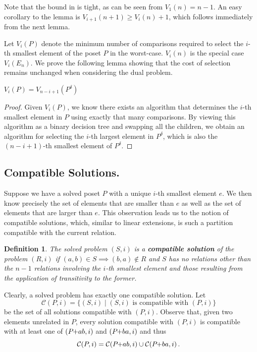 \documentclass[twoside,leqno,twocolumn]{article}
\newcommand{\pchild}[3]{{#1}\kern-1pt{+}{#2}{#3}}
\newcommand{\dual}[1]{{#1}^{\delta}}
\newtheorem{definition}{Definition}[section]
\begin{document}
Note that the bound in  is tight, as can be seen from $V_1(n) = n - 1$.
An easy corollary to the lemma is $V_{i + 1}(n + 1) \geq V_i(n) + 1$, which follows immediately from the next lemma.

Let $V_i(P)$ denote the minimum number of comparisons required to select the $i$-th smallest element of the poset $P$ in the worst-case.
$V_i(n)$ is the special case $V_i(E_n)$.
We prove the following lemma showing that the cost of selection remains unchanged when considering the dual problem.

\begin{lemma} \label{lemma:dual_poset_allowed}
  $V_i(P) = V_{n - i + 1}(\dual{P})$
\end{lemma}

\begin{proof}
  Given $V_i(P)$, we know there exists an algorithm that determines the $i$-th smallest element in $P$ using exactly that many comparisons.
  By viewing this algorithm as a binary decision tree and swapping all the children, we obtain an algorithm for selecting the $i$-th largest element in $\dual{P}$, which is also the $(n - i + 1)$-th smallest element of $\dual{P}$.
\end{proof}

\subsection{Compatible Solutions.}
Suppose we have a solved poset $P$ with a unique $i$-th smallest element $e$.
We then know precisely the set of elements that are smaller than $e$ as well as the set of elements that are larger than $e$.
This observation leads us to the notion of compatible solutions, which, similar to linear extensions, is such a partition compatible with the current relation.

\begin{definition}
  The solved problem $(S, i)$ is a \textbf{compatible solution} of the problem $(R, i)$ if $(a, b) \in S \implies (b, a) \notin R$ and $S$ has no relations other than the $n - 1$ relations involving the $i$-th smallest element and those resulting from the application of transitivity to the former.
\end{definition}

Clearly, a solved problem has exactly one compatible solution.
Let
\begin{equation*}
  \mathcal{C}(P, i) = \{(S, i) \mid (S, i) \text{ is compatible with } (P, i)\}
\end{equation*}
be the set of all solutions compatible with $(P, i)$.
Observe that, given two elements unrelated in $P$, every solution compatible with $(P, i)$ is compatible with at least one of $(\pchild{P}{a}{b}, i)$ and $(\pchild{P}{b}{a}, i)$ and thus
\begin{equation}\label{lemma:compatible_union}
  \mathcal{C}(P, i) = \mathcal{C}(\pchild{P}{a}{b}, i) \cup \mathcal{C}(\pchild{P}{b}{a}, i)\,\text{.}
\end{equation}
\end{document}

